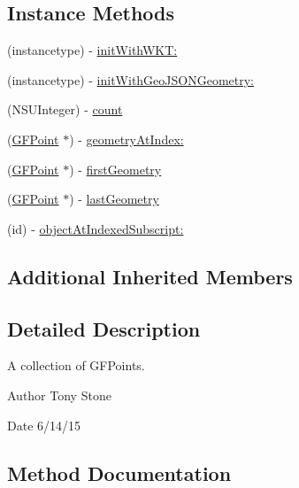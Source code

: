 \subsection*{Instance Methods}
\begin{DoxyCompactItemize}
\item 
(instancetype) -\/ \hyperlink{interface_g_f_multi_point_a003eb1cee88057991c210dd0cd63ef7f}{init\+With\+W\+K\+T\+:}
\item 
(instancetype) -\/ \hyperlink{interface_g_f_multi_point_a08bc62987b4e8c0435b00367dd617e00}{init\+With\+Geo\+J\+S\+O\+N\+Geometry\+:}
\item 
(N\+S\+U\+Integer) -\/ \hyperlink{interface_g_f_multi_point_afb692f3668a3631fbec6739c7fd7bf2c}{count}
\item 
(\hyperlink{interface_g_f_point}{G\+F\+Point} $\ast$) -\/ \hyperlink{interface_g_f_multi_point_a679f88a16cfc5e7d2d2bd1fda95303be}{geometry\+At\+Index\+:}
\item 
(\hyperlink{interface_g_f_point}{G\+F\+Point} $\ast$) -\/ \hyperlink{interface_g_f_multi_point_a2f300bc57f0010bc65da0f151b916e33}{first\+Geometry}
\item 
(\hyperlink{interface_g_f_point}{G\+F\+Point} $\ast$) -\/ \hyperlink{interface_g_f_multi_point_aa0c216ccbac49420bb8694fdb3311c6b}{last\+Geometry}
\item 
(id) -\/ \hyperlink{interface_g_f_multi_point_ae63934c501b12fa80e6ddaa739af16d9}{object\+At\+Indexed\+Subscript\+:}
\end{DoxyCompactItemize}
\subsection*{Additional Inherited Members}


\subsection{Detailed Description}
A collection of G\+F\+Points. 

\begin{DoxyAuthor}{Author}
Tony Stone 
\end{DoxyAuthor}
\begin{DoxyDate}{Date}
6/14/15 
\end{DoxyDate}


\subsection{Method Documentation}
\hypertarget{interface_g_f_multi_point_a003eb1cee88057991c210dd0cd63ef7f}{}
